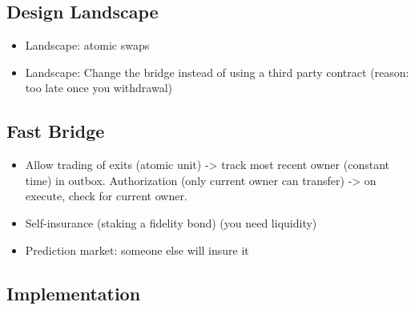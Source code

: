 \subsection{Design Landscape}

\begin{itemize}
\item Landscape: atomic swaps
\item Landscape: Change the bridge instead of using a third party contract (reason: too late once you withdrawal)
\end{itemize}

\subsection{Fast Bridge} 

\begin{itemize}
\item Allow trading of exits (atomic unit) -> track most recent owner (constant time) in outbox. Authorization (only current owner can transfer) -> on execute, check for current owner. 
\item Self-insurance (staking a fidelity bond) (you need liquidity) 
\item Prediction market: someone else will insure it
\end{itemize}

\subsection{Implementation} 

